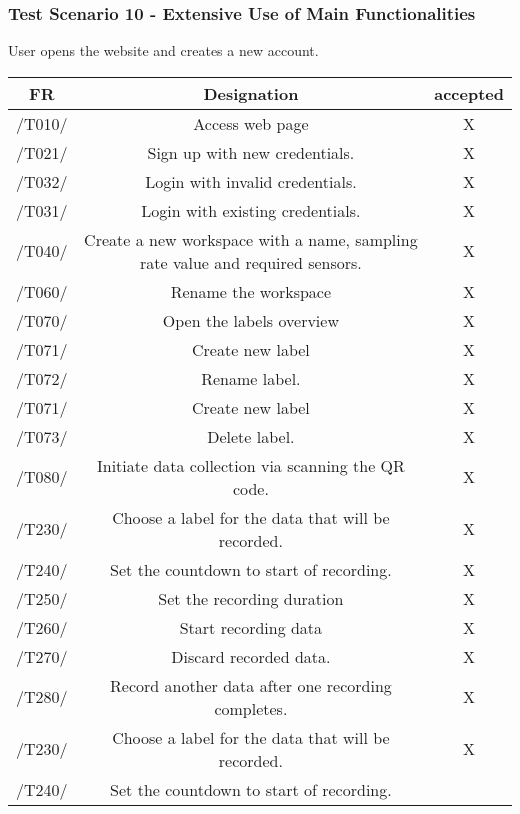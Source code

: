 \subsubsection{Test Scenario 10 - Extensive Use of Main Functionalities}
User opens the website and creates a new account.
\clearpage
\begin{table}[h]
\begin{tabular}{!{\VRule}c!{\VRule}c!{\VRule}c!{\VRule}}
\hline
FR     & Designation                                                                    &accepted                \\
\hline
  /T010/ &  Access web page &   X  \\
 \hline
 /T021/  &  Sign up with new credentials. &   X  \\
 \hline
 /T032/  &   Login with invalid credentials. &   X  \\
 \hline
  /T031/   &  Login with existing credentials. &   X  \\
 \hline
  /T040/   &  Create a new workspace with a name, sampling rate value and required
sensors.  &   X  \\
 \hline
 /T060/   &   Rename the workspace &   X  \\
 \hline
  /T070/   &  Open the labels overview &   X  \\
 \hline
 /T071/   &  Create new label  &   X  \\
 \hline
 /T072/  &  Rename label. &    X \\
 \hline
 /T071/   &  Create new label  &   X  \\
 \hline
 /T073/  &  Delete label. &   X  \\
 \hline
 /T080/    & Initiate data collection via scanning the QR code. &   X  \\
 \hline
 /T230/   &  Choose a label for the data that will be recorded.
 &   X  \\
 \hline
  /T240/ &  Set the countdown to start of recording.
 &   X  \\
 \hline
 /T250/   &  Set the recording duration &   X \\
 \hline
 /T260/   &   Start recording data &   X  \\
 \hline
  /T270/    &  Discard recorded data. &   X  \\
 \hline
  /T280/    &  Record another data after one recording completes.  &   X  \\
 \hline
 /T230/    &   Choose a label for the data that will be recorded. &   X  \\
 \hline
 /T240/ &  Set the countdown to start of recording.

\end{tabular}
\end{table}
